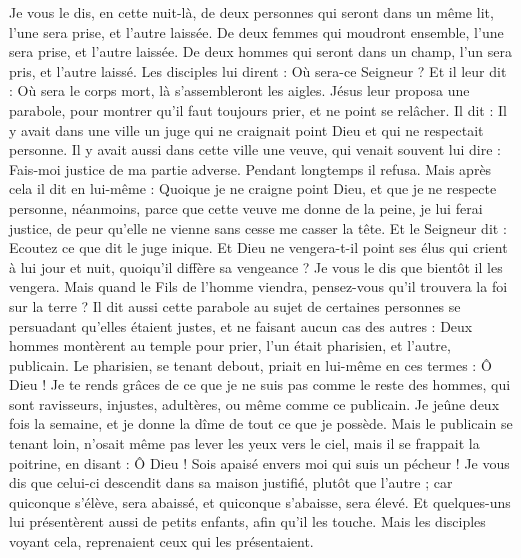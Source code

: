 \begin{multicols}{2}
Je vous le dis, en cette nuit-là, de deux personnes qui seront dans un même lit, l’une sera prise, et l'autre laissée.
De deux femmes qui moudront ensemble, l'une sera prise, et l'autre laissée.
De deux hommes qui seront dans un champ, l'un sera pris, et l'autre laissé.
Les disciples lui dirent : Où sera-ce Seigneur ? Et il leur dit : Où sera le corps mort, là s'assembleront les aigles.
\VerseOne{}Jésus leur proposa une parabole, pour montrer qu'il faut toujours prier, et ne point se relâcher.
Il dit : Il y avait dans une ville un juge qui ne craignait point Dieu et qui ne respectait personne.
Il y avait aussi dans cette ville une veuve, qui venait souvent lui dire : Fais-moi justice de ma partie adverse.
Pendant longtemps il refusa. Mais après cela il dit en lui-même : Quoique je ne craigne point Dieu, et que je ne respecte personne,
néanmoins, parce que cette veuve me donne de la peine, je lui ferai justice, de peur qu'elle ne vienne sans cesse me casser la tête.
Et le Seigneur dit : Ecoutez ce que dit le juge inique.
Et Dieu ne vengera-t-il point ses élus qui crient à lui jour et nuit, quoiqu'il diffère sa vengeance ?
Je vous le dis que bientôt il les vengera. Mais quand le Fils de l'homme viendra, pensez-vous qu'il trouvera la foi sur la terre ?
Il dit aussi cette parabole au sujet de certaines personnes se persuadant qu’elles étaient justes, et ne faisant aucun cas des autres :
Deux hommes montèrent au temple pour prier, l'un était pharisien, et l'autre, publicain.
Le pharisien, se tenant debout, priait en lui-même en ces termes : Ô Dieu ! Je te rends grâces de ce que je ne suis pas comme le reste des hommes, qui sont ravisseurs, injustes, adultères, ou même comme ce publicain.
Je jeûne deux fois la semaine, et je donne la dîme de tout ce que je possède.
Mais le publicain se tenant loin, n'osait même pas lever les yeux vers le ciel, mais il se frappait la poitrine, en disant : Ô Dieu ! Sois apaisé envers moi qui suis un pécheur !
Je vous dis que celui-ci descendit dans sa maison justifié, plutôt que l'autre ; car quiconque s'élève, sera abaissé, et quiconque s'abaisse, sera élevé.
Et quelques-uns lui présentèrent aussi de petits enfants, afin qu'il les touche. Mais les disciples voyant cela, reprenaient ceux qui les présentaient.

\end{multicols}
